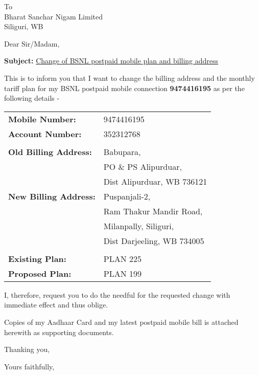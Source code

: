 \documentclass[12pt]{letter}
\begin{document}
\begin{letter}
	{
		To\\
		\vspace{20mm}
		Bharat Sanchar Nigam Limited\\
		Siliguri, WB
	}

	\opening{Dear Sir/Madam,}

	\begin{center}
		\textbf{Subject:} \underline{Change of BSNL postpaid mobile plan and billing address} 
	\end{center}

	This is to inform you that I want to change the billing address and the monthly tariff plan for my BSNL postpaid mobile connection \textbf{9474416195} as per the following details -

	\bigskip
	
	\begin{tabular}{ll}
		\textbf{Mobile Number:} & 9474416195\\
		\textbf{Account Number:} & 352312768\\
		\\
		\textbf{Old Billing Address:} & Babupara,\\
		 & PO \& PS Alipurduar,\\
		 & Dist Alipurduar, WB 736121\\
		\textbf{New Billing Address:} & Puspanjali-2,\\
		& Ram Thakur Mandir Road,\\
		& Milanpally, Siliguri,\\
		& Dist Darjeeling, WB 734005\\
		\\
		\textbf{Existing Plan:} & PLAN 225\\
		\textbf{Proposed Plan:} & PLAN 199
	\end{tabular}

	\bigskip

	I, therefore, request you to do the needful for the requested change with immediate effect and thus oblige.

	Copies of my Aadhaar Card and my latest postpaid mobile bill is attached herewith as supporting documents.

	Thanking you,


	\closing{Yours faithfully,}

\end{letter}
\end{document}
